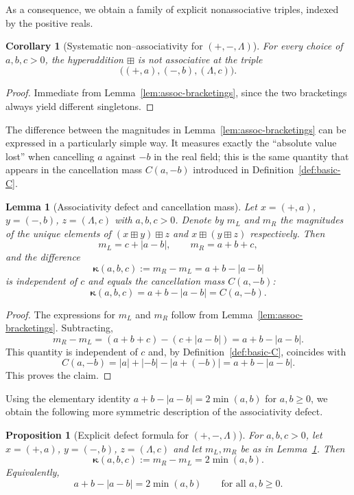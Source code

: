 \documentclass[11pt]{amsart}
\numberwithin{equation}{section}
\newtheorem{proposition}[theorem]{Proposition}
\newtheorem{lemma}[theorem]{Lemma}
\newtheorem{corollary}[theorem]{Corollary}
\theoremstyle{definition}
\theoremstyle{remark}
\newcommand{\AssocCurv}{\boldsymbol{\kappa}} %
\newcommand{\op}{\boxplus}                 %
\newcommand{\Cfun}{C}                      %
\begin{document}
As a consequence, we obtain a family of explicit nonassociative
triples, indexed by the positive reals.

\begin{corollary}[Systematic non--associativity for $(+,-,\Lambda)$]
\label{cor:assoc-failure-family}
For every choice of $a,b,c>0$, the hyperaddition $\op$ is not
associative at the triple
\[
  \bigl((+,a),(-,b),(\Lambda,c)\bigr).
\]
\end{corollary}

\begin{proof}
Immediate from Lemma~\ref{lem:assoc-bracketings}, since the two
bracketings always yield different singletons.
\end{proof}

The difference between the magnitudes in
Lemma~\ref{lem:assoc-bracketings} can be expressed in a particularly
simple way.  It measures exactly the ``absolute value lost'' when
cancelling $a$ against $-b$ in the real field; this is the same
quantity that appears in the cancellation mass
$\Cfun(a,-b)$ introduced in Definition~\ref{def:basic-C}.

\begin{lemma}[Associativity defect and cancellation mass]
\label{lem:assoc-defect-C}
Let $x=(+,a)$, $y=(-,b)$, $z=(\Lambda,c)$ with $a,b,c>0$.  Denote by
$m_L$ and $m_R$ the magnitudes of the unique elements of
$(x\op y)\op z$ and $x\op(y\op z)$ respectively.  Then
\[
  m_L = c+|a-b|,
  \qquad
  m_R = a+b+c,
\]
and the difference
\[
  \AssocCurv(a,b,c)
  := m_R-m_L
  = a+b-|a-b|
\]
is independent of $c$ and equals the cancellation mass
$\Cfun(a,-b)$:
\[
  \AssocCurv(a,b,c)
  = a+b-|a-b|
  = \Cfun(a,-b).
\]
\end{lemma}

\begin{proof}
The expressions for $m_L$ and $m_R$ follow from
Lemma~\ref{lem:assoc-bracketings}.  Subtracting,
\[
  m_R-m_L
  = (a+b+c)-(c+|a-b|)
  = a+b-|a-b|.
\]
This quantity is independent of $c$ and, by
Definition~\ref{def:basic-C}, coincides with
\[
  \Cfun(a,-b)
  = |a|+|-b|-|a+(-b)|
  = a+b-|a-b|.
\]
This proves the claim.
\end{proof}

Using the elementary identity
$a+b-|a-b| = 2\min(a,b)$ for $a,b\ge0$, we obtain the following
more symmetric description of the associativity defect.

\begin{proposition}[Explicit defect formula for $(+,-,\Lambda)$]
\label{prop:assoc-defect-2min}
For $a,b,c>0$, let $x=(+,a)$, $y=(-,b)$, $z=(\Lambda,c)$ and let
$m_L,m_R$ be as in Lemma~\ref{lem:assoc-defect-C}.  Then
\[
  \AssocCurv(a,b,c)
  := m_R-m_L
  = 2\min(a,b).
\]
Equivalently,
\[
  a+b-|a-b| = 2\min(a,b)
  \qquad\text{for all }a,b\ge0.
\]
\end{proposition}
\end{document}
